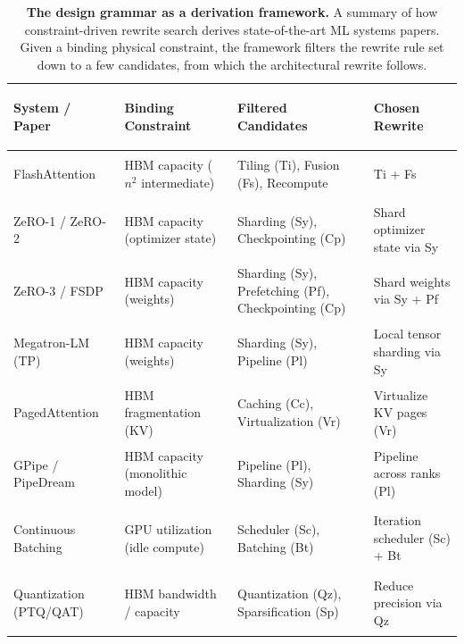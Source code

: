 
\begin{table}[t!]
\centering
\caption{\textbf{The design grammar as a derivation framework.} A summary of how constraint-driven rewrite search derives state-of-the-art ML systems papers. Given a binding physical constraint, the framework filters the rewrite rule set down to a few candidates, from which the architectural rewrite follows.}
\label{tab:predict-the-paper}
\scriptsize
\setlength{\tabcolsep}{4pt}
\renewcommand{\arraystretch}{0.94}
\begin{tabularx}{\textwidth}{@{} >{\bfseries\raggedright\arraybackslash}p{}
  >{\raggedright\arraybackslash}p{}
  >{\raggedright\arraybackslash}p{}
  >{\raggedright\arraybackslash}X @{}}
\toprule
\textbf{System / Paper} & \textbf{Binding Constraint} & \textbf{Filtered Candidates} & \textbf{Chosen Rewrite} \\
\midrule
FlashAttention & HBM capacity ($n^2$ intermediate) & Tiling (Ti), Fusion (Fs), Recompute & Ti + Fs \\
ZeRO-1 / ZeRO-2 & HBM capacity (optimizer state) & Sharding (Sy), Checkpointing (Cp) & Shard optimizer state via Sy \\
ZeRO-3 / FSDP & HBM capacity (weights) & Sharding (Sy), Prefetching (Pf), Checkpointing (Cp) & Shard weights via Sy + Pf \\
Megatron-LM (TP) & HBM capacity (weights) & Sharding (Sy), Pipeline (Pl) & Local tensor sharding via Sy \\
PagedAttention & HBM fragmentation (KV) & Caching (Cc), Virtualization (Vr) & Virtualize KV pages (Vr) \\
GPipe / PipeDream & HBM capacity (monolithic model) & Pipeline (Pl), Sharding (Sy) & Pipeline across ranks (Pl) \\
Continuous Batching & GPU utilization (idle compute) & Scheduler (Sc), Batching (Bt) & Iteration scheduler (Sc) + Bt \\
Quantization (PTQ/QAT) & HBM bandwidth / capacity & Quantization (Qz), Sparsification (Sp) & Reduce precision via Qz \\
\bottomrule
\end{tabularx}
\end{table}
